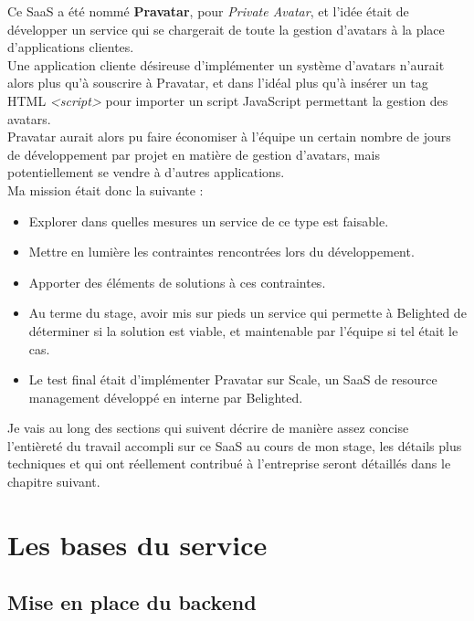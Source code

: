 \documentclass{report}
\begin{document}
  Ce SaaS a été nommé \textbf{Pravatar}, pour \textit{Private Avatar}, et l'idée était de développer un service qui se chargerait de toute la gestion d'avatars à la place d'applications clientes.\\
  Une application cliente désireuse d'implémenter un système d'avatars n'aurait alors plus qu'à souscrire à Pravatar, et dans l'idéal plus qu'à insérer un tag HTML \textit{<script>} pour importer un script
  JavaScript permettant la gestion des avatars.\\
  Pravatar aurait alors pu faire économiser à l'équipe un certain nombre de jours de développement par projet en matière de gestion d'avatars, mais potentiellement se vendre à d'autres applications.\\

  Ma mission était donc la suivante : \\

  \begin{itemize}
    \item Explorer dans quelles mesures un service de ce type est faisable.
    \item Mettre en lumière les contraintes rencontrées lors du développement.
    \item Apporter des éléments de solutions à ces contraintes.
    \item Au terme du stage, avoir mis sur pieds un service qui permette à Belighted de déterminer si la solution est viable, et maintenable par l'équipe si tel était le cas.
    \item Le test final était d'implémenter Pravatar sur Scale, un SaaS de resource management développé en interne par Belighted.\\
  \end{itemize}

  Je vais au long des sections qui suivent décrire de manière assez concise l'entièreté du travail accompli sur ce SaaS au cours de mon stage, les détails plus techniques et qui ont réellement contribué
  à l'entreprise seront détaillés dans le chapitre suivant.\\

  \section{Les bases du service}
  \label{sec:Les bases du service}

    \subsection{Mise en place du backend}
    \label{subs:Mise en place du backend}
\end{document}
